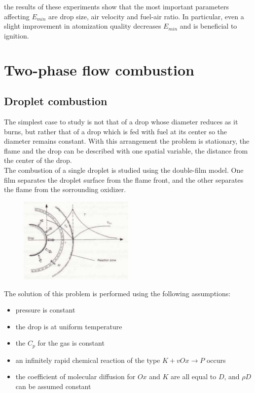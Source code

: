 \documentclass[12pt]{article}
\begin{document}
the results of these experiments show that the most important parameters affecting $E_{min}$ are drop size, air velocity and fuel-air ratio. In particular, even a slight improvement in atomization quality decreases $E_{min}$ and is beneficial to ignition.

\newpage

\section{Two-phase flow combustion}

\subsection{Droplet combustion}

The simplest case to study is not that of a drop whose diameter reduces as it burns, but rather that of a drop which is fed with fuel at its center so the diameter remains constant. With this arrangement the problem is stationary, the flame and the drop can be described with one spatial variable, the distance from the center of the drop.\\
The combustion of a single droplet is studied using the double-film model. One film separates the droplet surface from the flame front, and the other separates the flame from the sorrounding oxidizer.

\begin{figure}[h!]
\centering
\includegraphics[width=0.5\textwidth]{figures/droplet.png}
\end{figure}

The solution of this problem is performed using the following assumptions:

\begin{itemize}
    \item pressure is constant
    \item the drop is at uniform temperature
    \item the $C_{p}$ for the gas is constant
    \item an infinitely rapid chemical reaction of the type $K+vOx \rightarrow P$ occurs
    \item the coefficient of molecular diffusion for $Ox$ and $K$ are all equal to $D$, and $\rho D$ can be assumed constant
\end{itemize}
\end{document}
